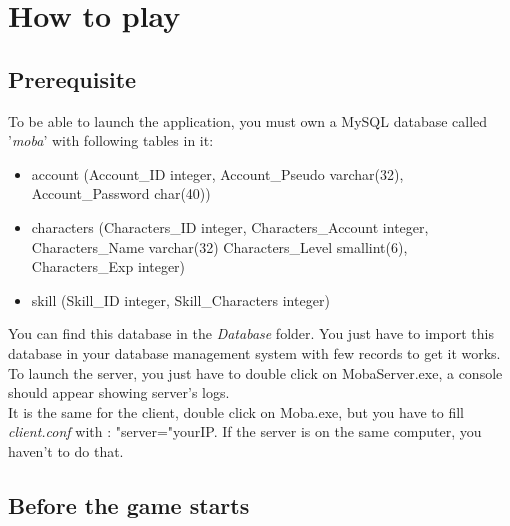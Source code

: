 \documentclass{scrreprt}
\begin{document}
		  \part{How to play}
		  \chapter{Prerequisite}
		  To be able to launch the application, you must own a MySQL database called '\emph{moba}' with following tables in it:
		  \begin{itemize}
		  \item{account (Account\_ID integer, Account\_Pseudo varchar(32), Account\_Password char(40))}
		  \item{characters (Characters\_ID integer, Characters\_Account integer, Characters\_Name varchar(32) Characters\_Level smallint(6), Characters\_Exp integer)}
		  \item{skill (Skill\_ID integer, Skill\_Characters integer)}
		  \end{itemize}
		
		  You can find this database in the \emph{Database} folder. You just have to import this database in your database management system with few records to get it works.\\

		  To launch the server, you just have to double click on MobaServer.exe, a console should appear showing server's logs.\\
		  It is the same for the client, double click on Moba.exe, but  you have to fill \emph{client.conf} with : "server="yourIP. If the server is on the same computer, you haven't to do that.

		  \chapter{Before the game starts}
\end{document}
